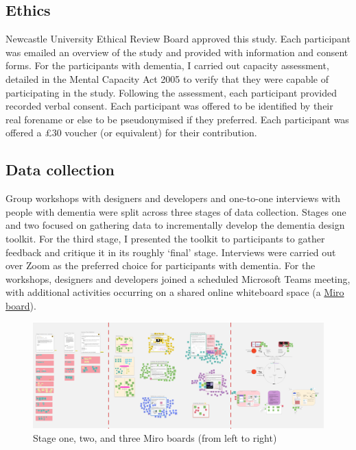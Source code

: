 \subsection{Ethics}
Newcastle University Ethical Review Board approved this study. Each participant was emailed an overview of the study and provided with information and consent forms. For the participants with dementia, I carried out capacity assessment, detailed in the Mental Capacity Act 2005 \citep{oyebode_mental_2005} to verify that they were capable of participating in the study. Following the assessment, each participant provided recorded verbal consent. Each participant was offered to be identified by their real forename or else to be pseudonymised if they preferred. Each participant was offered a £30 voucher (or equivalent) for their contribution.

\subsection{Data collection}
Group workshops with designers and developers and one-to-one interviews with people with dementia were split across three stages of data collection. Stages one and two focused on gathering data to incrementally develop the dementia design toolkit. For the third stage, I presented the toolkit to participants to gather feedback and critique it in its roughly `final' stage. Interviews were carried out over Zoom as the preferred choice for participants with dementia. For the workshops, designers and developers joined a scheduled Microsoft Teams meeting, with additional activities occurring on a shared online whiteboard space (a \href{https://miro.com}{Miro board}). 

\begin{figure}[htp]
\centering
\includegraphics[width=1\linewidth]{Images/D3Toolkit/Fig1.png}
\caption{Stage one, two, and three Miro boards (from left to right)}
\label{fig:StagesD3}
\end{figure}

